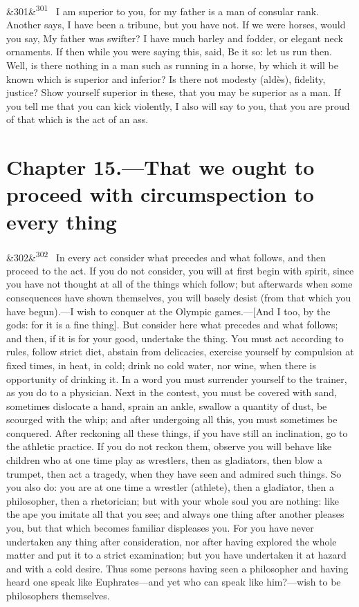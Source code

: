 \documentclass[12pt]{article}
\newcommand{\para}[1][]{\par\noindent\ifx&#1&\else\textsuperscript{\footnotesize #1}~\fi}
\begin{document}
\para[301] I am superior to you, for my father is a man of consular rank. Another says, I have been a tribune, but you have not. If we were horses, would you say, My father was swifter? I have much barley and fodder, or elegant neck ornaments. If then while you were saying this, said, Be it so: let us run then. Well, is there nothing in a man such as running in a horse, by which it will be known which is superior and inferior? Is there not modesty (aldès), fidelity, justice? Show yourself superior in these, that you may be superior as a man. If you tell me that you can kick violently, I also will say to you, that you are proud of that which is the act of an ass.

\section*{Chapter 15.---That we ought to proceed with circumspection to every thing}

\para[302] In every act consider what precedes and what follows, and then proceed to the act. If you do not consider, you will at first begin with spirit, since you have not thought at all of the things which follow; but afterwards when some consequences have shown themselves, you will basely desist (from that which you have begun).—I wish to conquer at the Olympic games.—[And I too, by the gods: for it is a fine thing]. But consider here what precedes and what follows; and then, if it is for your good, undertake the thing. You must act according to rules, follow strict diet, abstain from delicacies, exercise yourself by compulsion at fixed times, in heat, in cold; drink no cold water, nor wine, when there is opportunity of drinking it. In a word you must surrender yourself to the trainer, as you do to a physician. Next in the contest, you must be covered with sand, sometimes dislocate a hand, sprain an ankle, swallow a quantity of dust, be scourged with the whip; and after undergoing all this, you must sometimes be conquered. After reckoning all these things, if you have still an inclination, go to the athletic practice. If you do not reckon them, observe you will behave like children who at one time play as wrestlers, then as gladiators, then blow a trumpet, then act a tragedy, when they have seen and admired such things. So you also do: you are at one time a wrestler (athlete), then a gladiator, then a philosopher, then a rhetorician; but with your whole soul you are nothing: like the ape you imitate all that you see; and always one thing after another pleases you, but that which becomes familiar displeases you. For you have never undertaken any thing after consideration, nor after having explored the whole matter and put it to a strict examination; but you have undertaken it at hazard and with a cold desire. Thus some persons having seen a philosopher and having heard one speak like Euphrates—and yet who can speak like him?—wish to be philosophers themselves.
\end{document}

